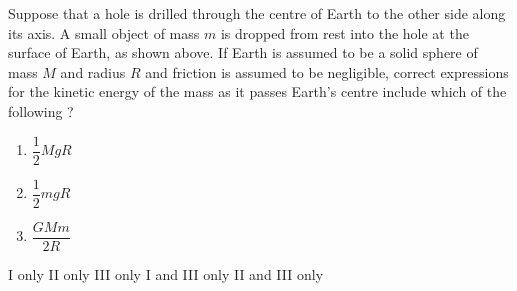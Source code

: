 \documentclass[12pt]{../../oss-apphys-exam}
\begin{document}
\begin{questions}
  \question Suppose that a hole is drilled through the centre of Earth to the
  other side along its axis. A small object of mass $m$ is dropped from rest
  into the hole at the surface of Earth, as shown above. If Earth is assumed to
  be a solid sphere of mass $M$ and radius $R$ and friction is assumed to be
  negligible, correct expressions for the kinetic energy of the mass as it
  passes Earth's centre include which of the following ?
  \begin{enumerate}[nosep]
  \item[I.] $\dfrac12MgR$
  \item[II.] $\dfrac12mgR$
  \item[III.] $\dfrac{GMm}{2R}$
  \end{enumerate}  
  \begin{choices}
    \choice I only
    \choice II only
    \choice III only
    \choice I and III only
    \choice II and III only
  \end{choices}
\end{questions}
\end{document}
